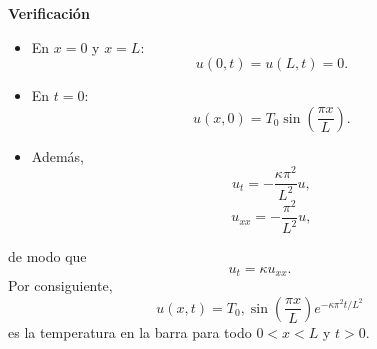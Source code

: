 \documentclass[11pt,spanish]{article}
\begin{document}
{\bf Verificación}

\begin{itemize}
\item En $x=0$ y $x=L$:
$$
u(0,t)=u(L,t)=0.
$$
\item En $t=0$:
$$
u(x,0)
=
T_0\sin\left(\frac{\pi x}{L}\right).
$$
\item Además,
$$
u_t
=
-\frac{\kappa\pi^2}{L^2}u,
$$
$$
u_{xx}
=
-\frac{\pi^2}{L^2}u,
$$
\end{itemize}
de modo que
$$
u_t=\kappa u_{xx}.
$$
Por consiguiente,
$$
\boxed{
u(x,t)=
T_0,\sin\left(\frac{\pi x}{L}\right)
e^{-\kappa\pi^2 t/L^2}
}
$$
es la temperatura en la barra para todo $0<x<L$ y $t>0$.


 
%
%
\end{document}
